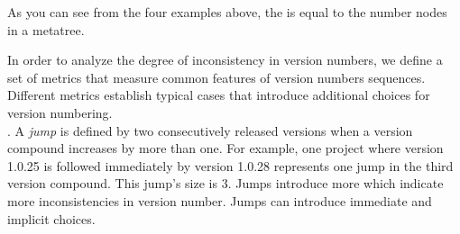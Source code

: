 \documentclass[conference]{IEEEtran}
\begin{document}
As you can see from the four examples above, the \numberchoices is equal to the number nodes in a metatree.

 



 










In order to analyze the degree of inconsistency in version numbers, we define 
a set of metrics that measure common features of version numbers sequences. Different metrics establish typical cases that introduce additional choices for version numbering. \\
 
 
 
 
. A \emph{jump} is defined by two consecutively released versions when a version compound increases by more than one.
For example, one project where version 1.0.25 is followed immediately by version 1.0.28 represents one jump in the third version compound. This jump's size is 3. Jumps introduce more \choices which indicate more inconsistencies in version number. 
Jumps can introduce immediate and implicit choices.
\end{document}
